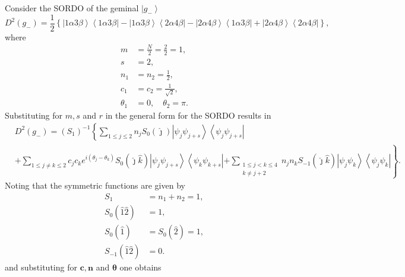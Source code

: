 \documentclass[aps,preprint]{revtex4}%
\begin{document}
Consider the SORDO of the geminal $\left\vert g_{-}\right\rangle $
\begin{equation}
D^{2}\left(  g_{-}\right)  =\frac{1}{2}\left\{  \left\vert 1\alpha
3\beta\right\rangle \left\langle 1\alpha3\beta\right\vert -\left\vert
1\alpha3\beta\right\rangle \left\langle 2\alpha4\beta\right\vert -\left\vert
2\alpha4\beta\right\rangle \left\langle 1\alpha3\beta\right\vert +\left\vert
2\alpha4\beta\right\rangle \left\langle 2\alpha4\beta\right\vert \right\}
,\label{Dirgm}%
\end{equation}
where
\begin{align}
m &  =\frac{N}{2}=\frac{2}{2}=1,\\
s &  =2,\\
n_{1} &  =n_{2}=\frac{1}{2},\\
c_{1} &  =c_{2}=\frac{1}{\sqrt{2}},\\
\theta_{1} &  =0,\quad\theta_{2}=\pi.
\end{align}
Substituting for $m,s$ and $r$ in the general form for the SORDO results in
\begin{align}
&  D^{2}\left(  g_{-}\right)  =\left(  S_{1}\right)  ^{-1}\left\{  \sum_{1\leq
j\leq2}n_{j}S_{0}\left(  \hat{\jmath}\right)  \left\vert \psi_{j}\psi
_{j+s}\right\rangle \left\langle \psi_{j}\psi_{j+s}\right\vert \right.
\nonumber\\
&  +\sum_{1\leq j\neq k\leq2}c_{j}c_{k}e^{i\left(  \theta_{j}-\theta
_{k}\right)  }S_{0}\left(  \hat{\jmath}\hat{k}\right)  \left\vert \psi_{j}%
\psi_{j+s}\right\rangle \left\langle \psi_{k}\psi_{k+s}\right\vert \left.
+\sum_{\substack{1\leq j<k\leq4\\k\neq j+2}}n_{j}n_{k}S_{-1}\left(
\hat{\jmath}\hat{k}\right)  \left\vert \psi_{j}\psi_{k}\right\rangle
\left\langle \psi_{j}\psi_{k}\right\vert \right\}  .
\end{align}
Noting that the symmetric functions are given by
\begin{align}
S_{1} &  =n_{1}+n_{2}=1,\\
S_{0}\left(  \hat{1}\hat{2}\right)   &  =1,\\
S_{0}\left(  \hat{1}\right)   &  =S_{0}\left(  \hat{2}\right)  =1,\\
S_{-1}\left(  \hat{1}\hat{2}\right)   &  =0.
\end{align}
and substituting for $\boldsymbol{c,n}$ and $\boldsymbol{\theta}$ one obtains
\end{document}
